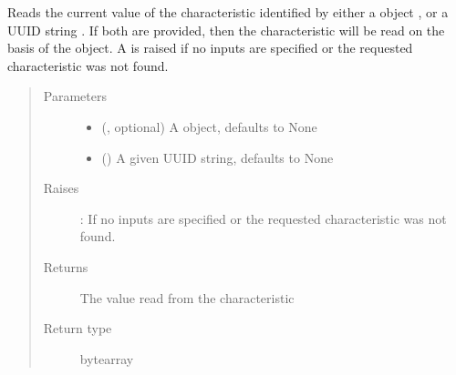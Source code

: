 \documentclass[letterpaper,10pt,english]{sphinxmanual}
\begin{document}
\begin{fulllineitems}
\begin{fulllineitems}
\label{\detokenize{simpleble:simpleble.SimpleBleClient.readCharacteristic}}
Reads the current value of the characteristic identified by either a  object , or a UUID string . If both are provided, then the characteristic will be read on the basis of the  object. A  is raised if no inputs are specified or the requested characteristic was not found.
\begin{quote}\begin{description}
\item[{Parameters}] \leavevmode\begin{itemize}
\item {} 
 (, optional) \textendash{} A  object, defaults to None

\item {} 
 (\sphinxstyleliteralemphasis{\sphinxupquote{, }}) \textendash{} A given UUID string, defaults to None

\end{itemize}

\item[{Raises}] \leavevmode
{}: If no inputs are specified or the requested characteristic was not found.

\item[{Returns}] \leavevmode
The value read from the characteristic

\item[{Return type}] \leavevmode
bytearray

\end{description}\end{quote}

\end{fulllineitems}



\end{fulllineitems}
\end{document}
